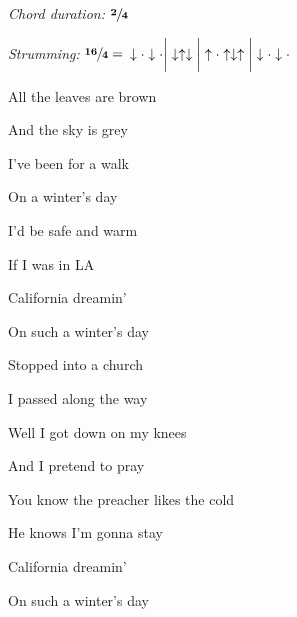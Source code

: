 \begin{song}



\textit{Chord duration: $\mathbf{\sfrac{2}{4}}$}

\textit{Strumming:} $\mathbf{\sfrac{16}{4}} =$ $\downarrow\cdot\downarrow\cdot\bigg|\downarrow\uparrow\downarrow\bigg|\uparrow\cdot\uparrow\downarrow\uparrow\bigg|\downarrow\cdot\downarrow\cdot$

\large

\begin{chordbox}
\par
{}\par
{}\par
{}\par
{}\par
{}\par
{}\par
\end{chordbox}

\Large

\bigskip

All the leaves are brown   \par
And the sky is grey  \par
I've been for a walk    \par
On a winter's day  \par
I’d be safe and warm   \par
If I was in LA  \par
California dreamin’   \par
On such a winter's day  \par

\bigskip

Stopped into a church   \par
I passed along the way  \par
Well I got down on my knees   \par
And I pretend to pray  \par
You know the preacher likes the cold   \par
He knows I'm gonna stay  \par
California dreamin’   \par
On such a winter's day  \par


\end{song}

